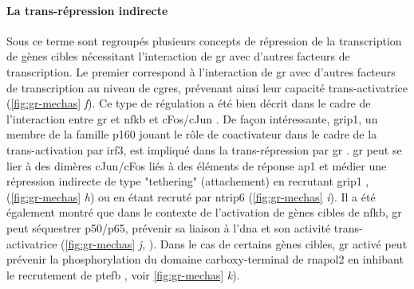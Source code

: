 \documentclass[../main.tex]{subfiles}
\begin{document}
\paragraph{La trans-répression indirecte}
Sous ce terme sont regroupés plusieurs concepts de répression de la transcription de gènes cibles nécessitant l'interaction de \gls{gr} avec d'autres facteurs de transcription.
Le premier correspond à l'interaction de \gls{gr} avec d'autres facteurs de transcription au niveau de \glspl{cgre}, prévenant ainsi leur capacité trans-activatrice (\autoref{fig:gr-mechas} \textit{f}).
Ce type de régulation a été bien décrit dans le cadre de l'interaction entre \gls{gr} et \gls{nfkb} \citep{Ray1994} et cFos/cJun \citep{Pearce1993}.
De façon intéressante, \gls{grip1}, un membre de la famille p160 jouant le rôle de coactivateur dans le cadre de la trans-activation par \gls{irf3}, est impliqué dans la trans-répression par \gls{gr} \citep{Reily2006}.
\gls{gr} peut se lier à des dimères cJun/cFos liés à des éléments de réponse \gls{ap1} et médier une répression indirecte de type "tethering" (attachement) en recrutant \gls{grip1} \citep{Rogatsky2002}, (\autoref{fig:gr-mechas} \textit{h}) ou en étant recruté par \gls{ntrip6} (\autoref{fig:gr-mechas} \textit{i}).
Il a été également montré que dans le contexte de l'activation de gènes cibles de \gls{nfkb}, \gls{gr} peut séquestrer p50/p65, prévenir sa liaison à l'\gls{dna} et son activité trans-activatrice (\autoref{fig:gr-mechas} \textit{j}, \citet{Mukaida1994,DeBosscher2003}).
Dans le cas de certains gènes cibles, \gls{gr} activé peut prévenir la phosphorylation du domaine carboxy-terminal de \gls{rnapol2} \citep{Nissen2000} en inhibant le recrutement de \gls{ptefb} \citep{Luecke2005}, voir \autoref{fig:gr-mechas} \textit{k}).
\end{document}
